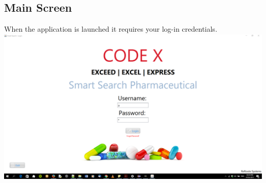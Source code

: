 \documentclass[a4paper,10pt]{article}
\begin{document}
	\subsection{Main Screen}
	When the application is launched it requires your log-in credentials.\\
	{\centering\includegraphics[width=15cm, scale=0.5]{2.png}}
\end{document}
